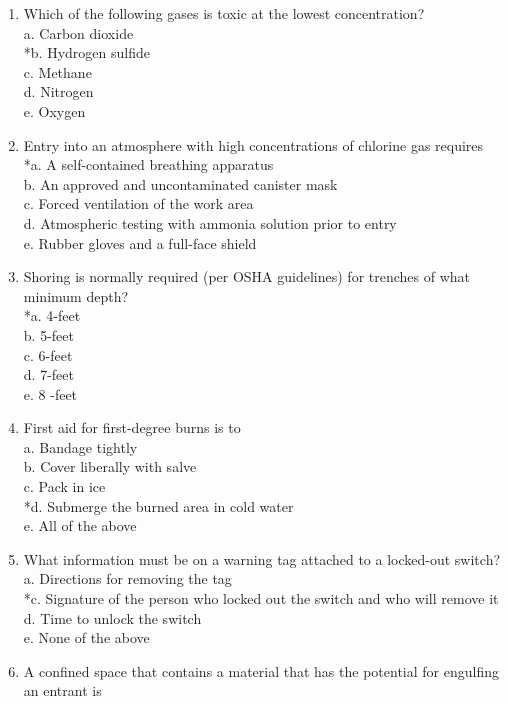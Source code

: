 \begin{enumerate}[1.]
\item Which of the following gases is toxic at the lowest concentration?\\
a. Carbon dioxide\\
*b. Hydrogen sulfide\\
c. Methane\\
d. Nitrogen\\
e. Oxygen\\
\item Entry into an atmosphere with high concentrations of chlorine gas requires\\
*a. A self-contained breathing apparatus\\
b. An approved and uncontaminated canister mask\\
c. Forced ventilation of the work area\\
d. Atmospheric testing with ammonia solution prior to entry\\
e. Rubber gloves and a full-face shield\\
\item Shoring is normally required (per OSHA guidelines) for trenches of what minimum depth?\\
*a. 4-feet\\
b. 5-feet\\
c. 6-feet\\
d. 7-feet\\
e. 8 -feet\\
\item First aid for first-degree burns is to\\
a. Bandage tightly\\
b. Cover liberally with salve\\
c. Pack in ice\\
*d. Submerge the burned area in cold water\\
e. All of the above\\
\item What information must be on a warning tag attached to a locked-out switch?\\
a. Directions for removing the tag\\
*c. Signature of the person who locked out the switch and who will remove it\\
d. Time to unlock the switch\\
e. None of the above\\
\item A confined space that contains a material that has the potential for engulfing an entrant is\\

\end{enumerate}

